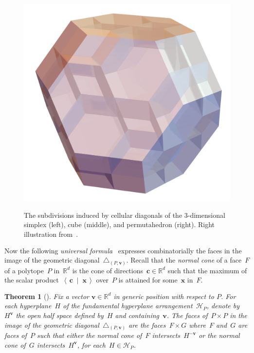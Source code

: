 \documentclass{amsart}
\newcommand{\darkblue}{\color{darkblue}} %
\newtheorem{theorem}{Theorem}[section]
\theoremstyle{definition}
\newcommand{\R}{\mathbb{R}} %
\renewcommand{\b}[1]{{\boldsymbol{#1}}} %
\newcommand{\dotprod}[2]{\left\langle \, #1 \; \middle| \; #2 \, \right\rangle} %
\newcommand{\defn}[1]{\textsl{\darkblue #1}} %
\renewcommand{\b}[1]{\boldsymbol{#1}} %
\begin{document}
\begin{figure}[p]
{		\includegraphics[scale=.3]{diagonalPermutahedronGuillaume.png}
	}
	\caption{The subdivisions induced by cellular diagonals of the $3$-dimensional simplex (left), cube (middle), and permutahedron (right). Right illustration from~\cite[Fig.~13]{LA21}.}
	\label{fig:examplesDiagonals2}
\end{figure}

Now the following \defn{universal formula}~\cite[Thm.~1.26]{LA21} expresses combinatorially the faces in the image of the geometric diagonal~$\triangle_{(P,\b{v})}$.
Recall that the \defn{normal cone} of a face~$F$ of a polytope~$P$ in~$\R^d$ is the cone of directions~$\b{c} \in \R^d$ such that the maximum of the scalar product~$\dotprod{\b{c}}{\b{x}}$ over~$P$ is attained for some~$\b{x}$ in~$F$.

\begin{theorem}[{\cite[Thm.~1.26]{LA21}}]
\label{thm:universalFormula}
Fix a vector $\b{v} \in \R^d$ in generic position with respect to $P$.
For each hyperplane~$H$ of the fundamental hyperplane arrangement~$\mathcal{H}_P$, denote by~$H^{\b{v}}$ the open half space defined by~$H$ and containing~$\b{v}$.
The faces of~$P \times P$ in the image of the geometric diagonal~$\triangle_{(P,\b{v})}$ are the faces~$F \times G$ where~$F$ and~$G$ are faces of~$P$ such that either the normal cone of~$F$ intersects~$H^{-\b{v}}$ or the normal cone of~$G$ intersects~$H^{\b{v}}$, for each~$H \in \mathcal{H}_P$.
\end{theorem}
\end{document}
